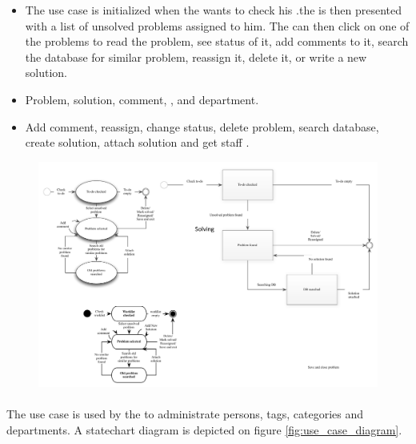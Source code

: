 \begin{itemize}
\item {} The use case is initialized when the \astaff[] wants to check his \todolist[].the \astaff[] is then presented with a list of unsolved problems assigned to him. The \astaff[] can then click on one of the problems to read the problem, see status of it, add comments to it, search the database for similar problem, reassign it, delete it, or write a new solution. 

\item {} Problem, solution, comment, \client[], \staff[] and department. 

\item {} Add comment, reassign, change status, delete problem, search database, create solution, attach solution and get staff \todolist{}.
\end{itemize}

\begin{figure}[htbp]
\begin{center}
 \includegraphics[scale=0.8]{input/application_domain_analysis/solve_problem_use_case}
\label{fig:solve_problem_use_case}
\end{center}
\end{figure}


\paragraph{\tucadmin[c]} The use case \tucadmin[] is used by the \sadmin[] to administrate persons, tags, categories and departments. A statechart diagram is depicted on figure \ref{fig:use_case_diagram}.

